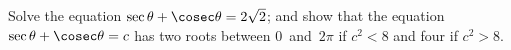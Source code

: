 Solve the equation $\sec\theta + \cosec\theta = 2\sqrt{2}$; and show that the equation
$\sec\theta + \cosec\theta = c$ has two roots between $0$~and~$2\pi$ if $c^{2} < 8$ and four if $c^{2} > 8$.

